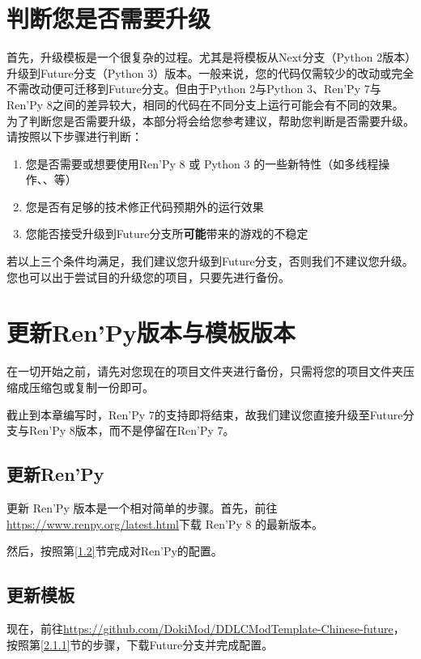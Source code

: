 \section{判断您是否需要升级}
首先，升级模板是一个很复杂的过程。尤其是将模板从Next分支（Python 2版本）升级到Future分支（Python 3）版本。一般来说，您的代码仅需较少的改动或完全不需改动便可迁移到Future分支。但由于Python 2与Python 3、Ren'Py 7与Ren'Py 8之间的差异较大，相同的代码在不同分支上运行可能会有不同的效果。为了判断您是否需要升级，本部分将会给您参考建议，帮助您判断是否需要升级。
请按照以下步骤进行判断：
\begin{enumerate}
    \item 您是否需要或想要使用Ren'Py 8 或 Python 3 的一些新特性（如多线程操作、、等）
    \item 您是否有足够的技术修正代码预期外的运行效果
    \item 您能否接受升级到Future分支所\textbf{可能}带来的游戏的不稳定
\end{enumerate}
若以上三个条件均满足，我们建议您升级到Future分支，否则我们不建议您升级。您也可以出于尝试目的升级您的项目，只要先进行备份。

\section{更新Ren'Py版本与模板版本}
在一切开始之前，请先对您现在的项目文件夹进行备份，只需将您的项目文件夹压缩成压缩包或复制一份即可。

\begin{Warning}
    截止到本章编写时，Ren'Py 7的支持即将结束，故我们建议您直接升级至Future分支与Ren'Py 8版本，而不是停留在Ren'Py 7。
\end{Warning}

\subsection{更新Ren'Py}
更新 Ren'Py 版本是一个相对简单的步骤。首先，前往\url{https://www.renpy.org/latest.html}下载 Ren'Py 8 的最新版本。

然后，按照第\ref{1.2}节完成对Ren'Py的配置。

\subsection{更新模板}
现在，前往\url{https://github.com/DokiMod/DDLCModTemplate-Chinese-future}，按照第\ref{2.1.1}节的步骤，下载Future分支并完成配置。

